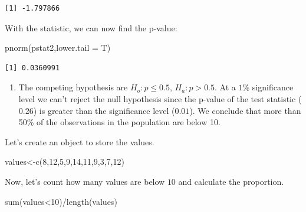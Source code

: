 \documentclass[
  letterpaper,
  DIV=11,
  numbers=noendperiod]{scrreprt}
\newenvironment{Shaded}{\begin{snugshade}}{\end{snugshade}}
\newcommand{\AttributeTok}[1]{\textcolor[rgb]{0.40,0.45,0.13}{#1}}
\newcommand{\DecValTok}[1]{\textcolor[rgb]{0.68,0.00,0.00}{#1}}
\newcommand{\FunctionTok}[1]{\textcolor[rgb]{0.28,0.35,0.67}{#1}}
\newcommand{\NormalTok}[1]{\textcolor[rgb]{0.00,0.23,0.31}{#1}}
\newcommand{\OtherTok}[1]{\textcolor[rgb]{0.00,0.23,0.31}{#1}}
\newcommand{\SpecialCharTok}[1]{\textcolor[rgb]{0.37,0.37,0.37}{#1}}
\providecommand{\tightlist}{%
  \setlength{\itemsep}{0pt}\setlength{\parskip}{0pt}}\usepackage{longtable,booktabs,array}
\begin{document}
\begin{verbatim}
[1] -1.797866
\end{verbatim}

With the statistic, we can now find the p-value:

\begin{Shaded}
\begin{Highlighting}[numbers=left,,]
\FunctionTok{pnorm}\NormalTok{(pstat2,}\AttributeTok{lower.tail =}\NormalTok{ T)}
\end{Highlighting}
\end{Shaded}

\begin{verbatim}
[1] 0.0360991
\end{verbatim}

\begin{blackbox}

\begin{enumerate}
\def\labelenumi{\arabic{enumi}.}
\setcounter{enumi}{2}
\tightlist
\item
  The competing hypothesis are \(H_{o}: p \leq 0.5\),
  \(H_{a}: p > 0.5\). At a \(1\)\% significance level we can't reject
  the null hypothesis since the p-value of the test statistic (\(0.26\))
  is greater than the significance level (\(0.01\)). We conclude that
  more than 50\% of the observations in the population are below 10.
\end{enumerate}

\end{blackbox}

Let's create an object to store the values.

\begin{Shaded}
\begin{Highlighting}[numbers=left,,]
\NormalTok{values}\OtherTok{\textless{}{-}}\FunctionTok{c}\NormalTok{(}\DecValTok{8}\NormalTok{,}\DecValTok{12}\NormalTok{,}\DecValTok{5}\NormalTok{,}\DecValTok{9}\NormalTok{,}\DecValTok{14}\NormalTok{,}\DecValTok{11}\NormalTok{,}\DecValTok{9}\NormalTok{,}\DecValTok{3}\NormalTok{,}\DecValTok{7}\NormalTok{,}\DecValTok{12}\NormalTok{)}
\end{Highlighting}
\end{Shaded}

Now, let's count how many values are below \(10\) and calculate the
proportion.

\begin{Shaded}
\begin{Highlighting}[numbers=left,,]
\FunctionTok{sum}\NormalTok{(values}\SpecialCharTok{\textless{}}\DecValTok{10}\NormalTok{)}\SpecialCharTok{/}\FunctionTok{length}\NormalTok{(values)}
\end{Highlighting}
\end{Shaded}
\end{document}

